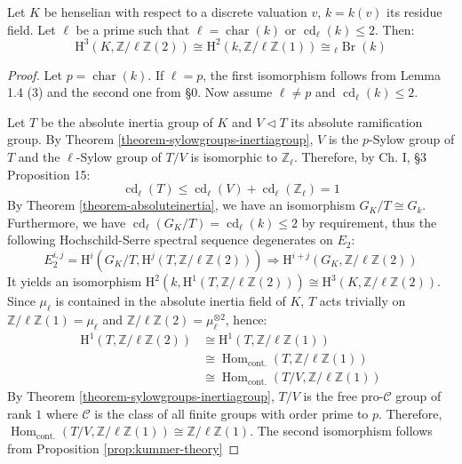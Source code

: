 \begin{lemma}\label{2.4-pre}
Let $K$ be henselian with respect to a discrete valuation $v$, $k=k(v)$ its residue field. Let $\ell$ be a prime such that $\ell=\operatorname{char}(k)$ or $\operatorname{cd}_\ell(k)\leq 2$. Then:
\[ \mathrm{H}^3(K, \mathbb{Z}/\ell\mathbb{Z}(2)) \cong \mathrm{H}^2(k, \mathbb{Z}/\ell\mathbb{Z}(1)) \cong {}_\ell\operatorname{Br}(k) \]
\end{lemma}

\begin{proof}
Let $p=\operatorname{char}(k)$. If $\ell = p$, the first isomorphism follows from \cite{Ka86} Lemma 1.4 (3) and the second one from \cite{Ka86} §0. Now assume $\ell\neq p$ and $\operatorname{cd}_\ell(k)\leq 2$.

Let $T$ be the absolute inertia group of $K$ and $V\lhd T$ its absolute ramification group. By Theorem \ref{theorem-sylowgroups-inertiagroup}, $V$ is the $p$-Sylow group of $T$ and the $\ell$-Sylow group of $T/V$ is isomorphic to $\mathbb{Z}_\ell$. Therefore, by \cite{Se64} Ch. I, §3 Proposition 15:
\[ \operatorname{cd}_\ell(T)\leq \operatorname{cd}_\ell(V) + \operatorname{cd}_\ell(\mathbb{Z}_\ell) = 1 \]
By Theorem \ref{theorem-absoluteinertia}, we have an isomorphism $G_K/T\cong G_k$. Furthermore, we have $\operatorname{cd}_\ell(G_K/T)=\operatorname{cd}_\ell(k)\leq 2$ by requirement,
thus the following Hochschild-Serre spectral sequence degenerates on $E_2$:
\[E_2^{i,j}=\mathrm{H}^i(G_K/T, \mathrm{H}^j(T, \mathbb{Z}/\ell\mathbb{Z}(2)))\Longrightarrow\mathrm{H}^{i+j}(G_K, \mathbb{Z}/\ell\mathbb{Z}(2))\]
It yields an isomorphism $\mathrm{H}^2(k, \mathrm{H}^1(T, \mathbb{Z}/\ell\mathbb{Z}(2)))\cong \mathrm{H}^3(K, \mathbb{Z}/\ell\mathbb{Z}(2))$. Since $\mu_{\ell}$ is contained in the absolute inertia field of $K$, $T$ acts trivially on $\mathbb{Z}/\ell\mathbb{Z}(1)= \mu_{\ell}$ and $\mathbb{Z}/\ell\mathbb{Z}(2)=\mu_{\ell}^{\otimes 2}$, hence:
\begin{align*}
\mathrm{H}^1(T, \mathbb{Z}/\ell\mathbb{Z}(2)) &\cong \mathrm{H}^1(T, \mathbb{Z}/\ell\mathbb{Z}(1)) \\
&\cong \operatorname{Hom}_\text{cont.}(T, \mathbb{Z}/\ell\mathbb{Z}(1)) \\
&\cong \operatorname{Hom}_\text{cont.}(T/V, \mathbb{Z}/\ell\mathbb{Z}(1))
\end{align*}
By Theorem \ref{theorem-sylowgroups-inertiagroup}, $T/V$ is the free pro-$\mathcal{C}$ group of rank $1$ where $\mathcal{C}$ is the class of all finite groups with order prime to $p$. Therefore, $\operatorname{Hom}_\text{cont.}(T/V, \mathbb{Z}/\ell\mathbb{Z}(1))\cong \mathbb{Z}/\ell\mathbb{Z}(1)$. The second isomorphism follows from Proposition \ref{prop:kummer-theory}
\end{proof}


